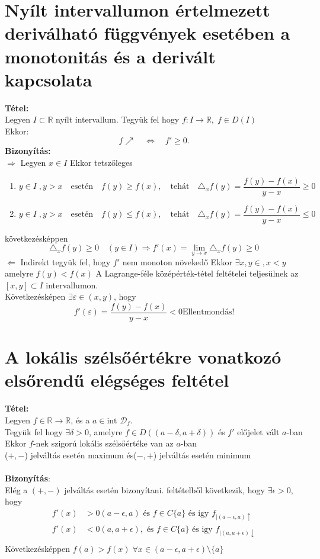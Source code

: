 \documentclass[10pt,a4paper]{article}
\newcommand{\R}{\mathbb{R}}
\newcommand{\D}{\mathcal{D}}
\newcommand{\fR}{f\in\R\rightarrow\R}
\newcommand{\f}[1][x]{f(#1)}
\begin{document}
\section{Nyílt intervallumon értelmezett deriválható függvények esetében a monotonitás és a derivált kapcsolata}
\textbf{Tétel:} \\
Legyen $I \subset \R $ nyílt intervallum. Tegyük fel hogy $f : I \rightarrow \R, \; f\in D(I)$\\ Ekkor:
\[
f\nearrow \quad \Longleftrightarrow \quad f'\geq 0.
\] 
\textbf{Bizonyítás:} \\
$\Longrightarrow$ Legyen $x\in I$ Ekkor tetszőleges
\begin{enumerate}
\item \[y\in I \; , y>x \quad \text{esetén} \quad f(y)\geq f(x), \quad \text{tehát} \quad \triangle_x f(y) = \frac{f(y)-f(x)}{y-x} \geq 0  \]
\item \[y\in I \; , y>x \quad \text{esetén} \quad f(y)\leq f(x), \quad \text{tehát} \quad \triangle_x f(y) = \frac{f(y)-f(x)}{y-x} \leq 0  \]
\end{enumerate}
következésképpen
\[
\triangle_x f(y)\geq 0 \quad (y\in I) \Longrightarrow f'(x) = \lim\limits_{y\rightarrow x} \triangle_x f(y) \geq 0
\]
$\Longleftarrow$ Indirekt tegyük fel, hogy $f'$ nem monoton növekedő 
Ekkor $\exists x,y \in , x<y$ amelyre $f(y)<f(x)$
A Lagrange-féle középérték-tétel feltételei teljesülnek az $[x,y]\subset I$ intervallumon. \\
Következésképen $\exists \varepsilon \in (x,y)$, hogy 
\[
f'(\varepsilon) = \frac{f(y)-f(x)}{y-x} < 0 \text{Ellentmondás!}
\]
\newpage
\section{A lokális szélsőértékre vonatkozó elsőrendű elégséges feltétel}
\textbf{Tétel:} \\
Legyen $\fR$, és a $a\in \text{int }\D_f$.\\
Tegyük fel hogy $\exists \delta >0$, amelyre $f\in D((a-\delta ,a+\delta )) $ és $f'$ előjelet vált $a$-ban \\
Ekkor $f$-nek szigorú lokális szélsőértéke van az $a$-ban \\
($+,-$) jelváltás esetén maximum és($-,+$) jelváltás esetén minimum \\ \\
\textbf{Bizonyítás}:\\
Elég a $(+,-)$ jelváltás esetén bizonyítani.
feltételből következik, hogy $\exists \epsilon >0$, hogy
\begin{align*}
f'(x)&>0 (a-\epsilon,a) \text{ és } f\in C\{a\} \text{ és igy  } f_{\big\lvert (a-\epsilon,a)\uparrow} \\
f'(x)&<0 (a,a+\epsilon), \text{ és } f\in C\{a\} \text{ és igy } f_{\big\lvert (a,a+\epsilon)\downarrow} \\
\end{align*}
Következésképpen $f(a)>\f \; \forall x \in (a-\epsilon,a+\epsilon) \setminus \{a\}$
\newpage
\end{document}
